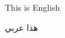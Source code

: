 \documentclass{article}
\begin{document}
This is English

\foreignlanguage{arabic}{هذا عربي}
\end{document}
